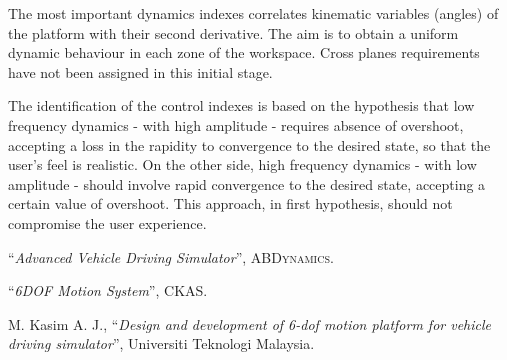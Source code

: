 \documentclass[10.5pt, twocolumn]{article}
\newcommand{\Virgolette}[1]{``#1''}
\begin{document}
The most important dynamics indexes correlates kinematic variables (angles) of the platform with their second derivative.
The aim is to obtain a uniform dynamic behaviour in each zone of the workspace.
Cross planes requirements have not been assigned in this initial stage.

The identification of the control indexes is based on the hypothesis that low frequency dynamics - with high amplitude - requires absence of overshoot, accepting a loss in the rapidity to convergence to the desired state, so that the user's feel is realistic.
On the other side, high frequency dynamics - with low amplitude - should involve rapid convergence to the desired state, accepting a certain value of overshoot.
This approach, in first hypothesis, should not compromise the user experience.





\begin{thebibliography}{}
\Virgolette{\textit{Advanced Vehicle Driving Simulator}}, \textsc{ABDynamics}.

\Virgolette{\textit{6DOF Motion System}}, \textsc{CKAS}.

M. Kasim A. J., \Virgolette{\textit{Design and development of 6-dof motion platform for vehicle driving simulator}}, Universiti Teknologi Malaysia.
\end{thebibliography}
\end{document}
